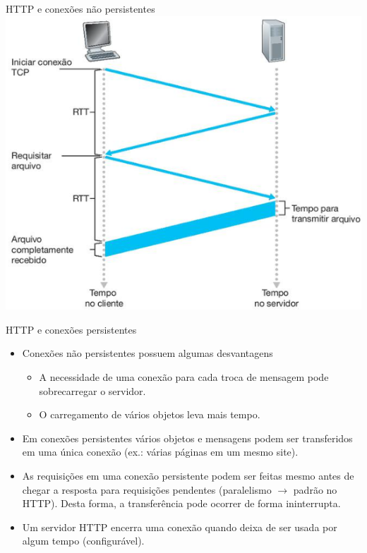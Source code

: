 \documentclass{libs/ufc_format}
\begin{document}
\begin{frame}{HTTP e conexões não persistentes}
    \centering
    \includegraphics[scale=0.6]{figuras/figura04_02}
\end{frame}

\begin{frame}{HTTP e conexões persistentes}
    \begin{itemize}
        \justifying
        \item Conexões não persistentes possuem algumas desvantagens
            \begin{itemize}
                \justifying
                \item A necessidade de uma conexão para cada troca de mensagem pode sobrecarregar o servidor.
                \item O carregamento de vários objetos leva mais tempo.
            \end{itemize}
        \item<2-> Em conexões persistentes vários objetos e mensagens podem ser transferidos em uma única conexão (ex.: várias páginas em um mesmo site).
        \item<3-> As requisições em uma conexão persistente podem ser feitas mesmo antes de chegar a resposta para requisições pendentes (paralelismo $\rightarrow$ padrão no HTTP). Desta forma, a transferência pode ocorrer de forma ininterrupta.
        \item<4> Um servidor HTTP encerra uma conexão quando deixa de ser usada por algum tempo (configurável).
    \end{itemize}
\end{frame}
\end{document}
